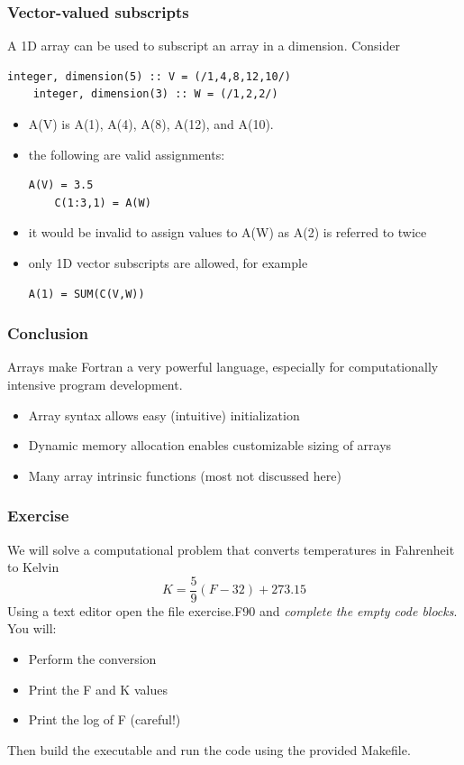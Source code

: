 \documentclass[11pt]{beamer}
\begin{document}
\begin{frame}[fragile]
\frametitle{Vector-valued subscripts}

\footnotesize{
A 1D array can be used to subscript an array in a dimension. Consider
\begin{lstlisting}[style=Fortran]
    integer, dimension(5) :: V = (/1,4,8,12,10/)
    integer, dimension(3) :: W = (/1,2,2/)
 \end{lstlisting}
\begin{itemize}
\item A(V) is A(1), A(4), A(8), A(12), and A(10).
\item the following are valid assignments:
\begin{lstlisting}[style=Fortran]
    A(V) = 3.5
    C(1:3,1) = A(W)
 \end{lstlisting}
\item it would be invalid to assign values to A(W) as A(2) is referred to twice
\item only 1D vector subscripts are allowed, for example
\begin{lstlisting}[style=Fortran]
    A(1) = SUM(C(V,W))
 \end{lstlisting}
 \end{itemize}
}

\end{frame}



\begin{frame}[fragile]
\frametitle{Conclusion}

Arrays make Fortran a very powerful language, especially for computationally intensive program development.
\scriptsize{
\begin{itemize}
\item Array syntax allows easy (intuitive) initialization
\item Dynamic memory allocation enables customizable sizing of arrays
\item Many array intrinsic functions (most not discussed here)
\end{itemize}
}

\end{frame}



\begin{frame}[fragile]
\frametitle{Exercise}

We will solve a computational problem that converts temperatures in Fahrenheit to Kelvin\\
\begin{equation}
K = \frac{5}{9}(F - 32) + 273.15
\end{equation}
Using a text editor open the file exercise.F90 and \emph{complete the empty code blocks}. You will:
\begin{itemize}
\item Perform the conversion
\item Print the F and K values
\item Print the log of F (careful!)
 \end{itemize}
Then build the executable and run the code using the provided Makefile.

\end{frame}
\end{document}
